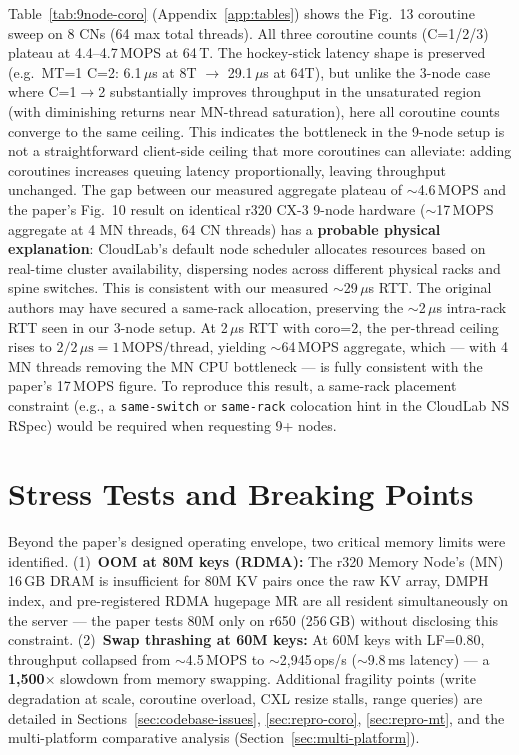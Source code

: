 \documentclass[conference]{IEEEtran}
\begin{document}
Table~\ref{tab:9node-coro} (Appendix~\ref{app:tables}) shows the Fig.~13 coroutine sweep on 8 CNs (64 max total threads). All three coroutine counts (C=1/2/3) plateau at 4.4--4.7\,MOPS at 64\,T. The hockey-stick latency shape is preserved (e.g.\ MT=1 C=2: 6.1\,$\mu$s at 8T $\to$ 29.1\,$\mu$s at 64T), but unlike the 3-node case where C=1$\to$2 substantially improves throughput in the unsaturated region (with diminishing returns near MN-thread saturation), here all coroutine counts converge to the same ceiling. This indicates the bottleneck in the 9-node setup is not a straightforward client-side ceiling that more coroutines can alleviate: adding coroutines increases queuing latency proportionally, leaving throughput unchanged. The gap between our measured aggregate plateau of $\sim$4.6\,MOPS and the paper's Fig.~10 result on identical r320 CX-3 9-node hardware ($\sim$17\,MOPS aggregate at 4 MN threads, 64 CN threads) has a \textbf{probable physical explanation}: CloudLab's default node scheduler allocates resources based on real-time cluster availability, dispersing nodes across different physical racks and spine switches. This is consistent with our measured $\sim$29\,$\mu$s RTT. The original authors may have secured a same-rack allocation, preserving the $\sim$2\,$\mu$s intra-rack RTT seen in our 3-node setup. At 2\,$\mu$s RTT with coro=2, the per-thread ceiling rises to $2/2\,\mu\text{s}=1\,\text{MOPS/thread}$, yielding $\sim$64\,MOPS aggregate, which --- with 4 MN threads removing the MN CPU bottleneck --- is fully consistent with the paper's 17\,MOPS figure. To reproduce this result, a same-rack placement constraint (e.g., a \texttt{same-switch} or \texttt{same-rack} colocation hint in the CloudLab NS RSpec) would be required when requesting 9+ nodes.

\section{Stress Tests and Breaking Points}\label{sec:stress}

Beyond the paper's designed operating envelope, two critical memory limits were identified. (1)~\textbf{OOM at 80M keys (RDMA):} The r320 Memory Node's (MN) 16\,GB DRAM is insufficient for 80M KV pairs once the raw KV array, DMPH index, and pre-registered RDMA hugepage MR are all resident simultaneously on the server --- the paper tests 80M only on r650 (256\,GB) without disclosing this constraint. (2)~\textbf{Swap thrashing at 60M keys:} At 60M keys with LF=0.80, throughput collapsed from $\sim$4.5\,MOPS to $\sim$2,945\,ops/s ($\sim$9.8\,ms latency) --- a \textbf{1,500$\times$} slowdown from memory swapping. Additional fragility points (write degradation at scale, coroutine overload, CXL resize stalls, range queries) are detailed in Sections~\ref{sec:codebase-issues}, \ref{sec:repro-coro}, \ref{sec:repro-mt}, and the multi-platform comparative analysis (Section~\ref{sec:multi-platform}).
\end{document}
